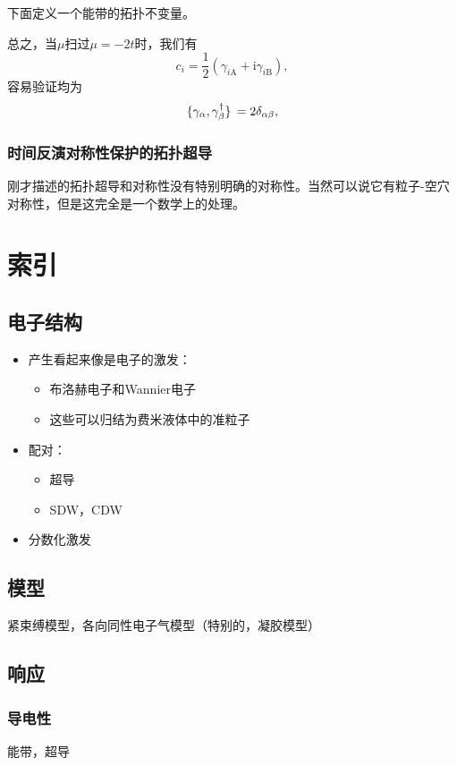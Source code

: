 \documentclass[hyperref, UTF8, a4paper]{ctexart}
\newcommand*{\ii}{\mathrm{i}}
\begin{document}
下面定义一个能带的拓扑不变量。

总之，当$\mu$扫过$\mu=-2t$时，我们有
\[
    {c}_i = \frac{1}{2} ({\gamma}_{i\text{A}} + \ii {\gamma}_{i \text{B}}),
\]
容易验证均为
\begin{equation}
    \acomm*{{\gamma}_\alpha}{{\gamma}_\beta^\dagger} = 2 \delta_{\alpha \beta},
\end{equation}

\subsubsection{时间反演对称性保护的拓扑超导}

刚才描述的拓扑超导和对称性没有特别明确的对称性。当然可以说它有粒子-空穴对称性，但是这完全是一个数学上的处理。

\section*{索引}

\subsection{电子结构}


\begin{itemize}
    \item 产生看起来像是电子的激发：
    \begin{itemize}
        \item 布洛赫电子和Wannier电子
        \item 这些可以归结为费米液体中的准粒子
    \end{itemize}
    \item 配对：
    \begin{itemize}
        \item 超导
        \item SDW，CDW
    \end{itemize}
    \item 分数化激发
\end{itemize}

\subsection{模型}

紧束缚模型，各向同性电子气模型（特别的，凝胶模型）

\subsection{响应}

\subsubsection{导电性}

能带，超导
\end{document}
